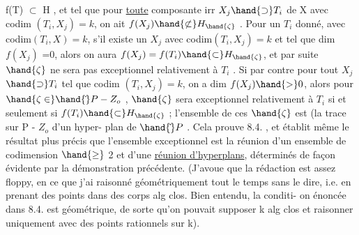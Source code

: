  f(T) $\subset$ H , et tel que pour \uline{toute} composante irr $X_j \hand{\supset} T_i$ de X
avec codim $(T_i,X_j)=k$, on ait $f(X_j)\hand{\not\subset} H_{\hand{\zeta}}$ . Pour un $T_i$ donné,
 avec codim$(T_i,X)=k$, s'il existe un $X_j$ avec codim$(T_i,X_j)=k$
et tel que dim $f(X_j)$ =0, alors 
 on aura $f(X_j) = f(T_i) \hand{\subset} H_{\hand{\zeta}}$, et par suite $\hand{\zeta}$ ne
sera pas exceptionnel relativement à $T_i$ . Si par contre pour tout $X_j$
$\hand{\supset} T_i$ tel que codim $(T_i,X_j) = k$, on a dim $f(X_j) \hand{>} 0$, alors pour
$\hand{\zeta \in} \hand{\check{}}P - Z_o$ , $\hand{\zeta}$ sera exceptionnel relativement à $T_i$ si et seulement si
$f(T_i) \hand{\subset} H_{\hand{\zeta}}$ ; l'ensemble de ces $\hand{\zeta}$ est (la trace sur P - $Z_o$ d'\hand{)}un hyper-
plan de $\hand{\check{}}P$ . Cela prouve 8.4. , et établit même le résultat plus précis
que l'ensemble exceptionnel est la réunion d'un ensemble de codimension
$\hand{\geq}$ 2 et d'une \uline{réunion d'hyperplans}, déterminés de façon évidente par la
démonstration précédente. (J'avoue que la rédaction est assez floppy, 
en ce que j'ai raisonné géométriquement tout le temps sans le dire, i.e.
en prenant des points dans des corps alg clos. Bien entendu, la conditi-
on énoncée dans 8.4. est  géométrique, de sorte qu'on pouvait supposer
k alg clos et raisonner uniquement avec des points rationnels sur k).

 

